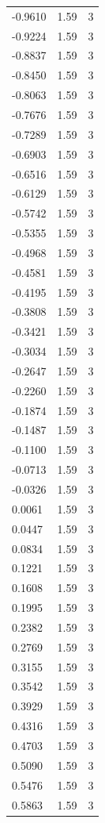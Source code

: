 \begin{longtable}{lrr}
  -0.9610 & 1.59 & 3 \\
  -0.9224 & 1.59 & 3 \\
  -0.8837 & 1.59 & 3 \\
  -0.8450 & 1.59 & 3 \\
  -0.8063 & 1.59 & 3 \\
  -0.7676 & 1.59 & 3 \\
  -0.7289 & 1.59 & 3 \\
  -0.6903 & 1.59 & 3 \\
  -0.6516 & 1.59 & 3 \\
  -0.6129 & 1.59 & 3 \\
  -0.5742 & 1.59 & 3 \\
  -0.5355 & 1.59 & 3 \\
  -0.4968 & 1.59 & 3 \\
  -0.4581 & 1.59 & 3 \\
  -0.4195 & 1.59 & 3 \\
  -0.3808 & 1.59 & 3 \\
  -0.3421 & 1.59 & 3 \\
  -0.3034 & 1.59 & 3 \\
  -0.2647 & 1.59 & 3 \\
  -0.2260 & 1.59 & 3 \\
  -0.1874 & 1.59 & 3 \\
  -0.1487 & 1.59 & 3 \\
  -0.1100 & 1.59 & 3 \\
  -0.0713 & 1.59 & 3 \\
  -0.0326 & 1.59 & 3 \\
  0.0061 & 1.59 & 3 \\
  0.0447 & 1.59 & 3 \\
  0.0834 & 1.59 & 3 \\
  0.1221 & 1.59 & 3 \\
  0.1608 & 1.59 & 3 \\
  0.1995 & 1.59 & 3 \\
  0.2382 & 1.59 & 3 \\
  0.2769 & 1.59 & 3 \\
  0.3155 & 1.59 & 3 \\
  0.3542 & 1.59 & 3 \\
  0.3929 & 1.59 & 3 \\
  0.4316 & 1.59 & 3 \\
  0.4703 & 1.59 & 3 \\
  0.5090 & 1.59 & 3 \\
  0.5476 & 1.59 & 3 \\
  0.5863 & 1.59 & 3 \\

\end{longtable}
